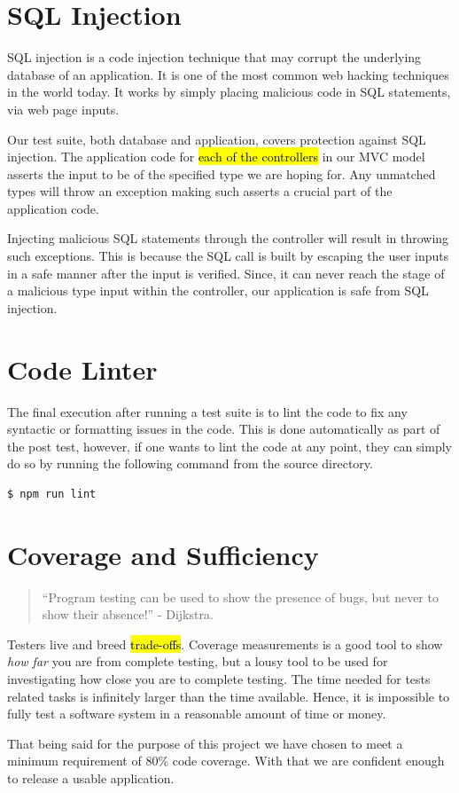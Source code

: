 \documentclass[fontsize=12pt,paper=letter,twoside]{scrartcl}
\begin{document}
\newpage
\section{SQL Injection}
SQL injection is a code injection technique that may corrupt the underlying database of an application. It is one of the most common web hacking techniques in the world today. It works by simply placing malicious code in SQL statements, via web page inputs.

\bigskip
\noindent Our test suite, both database and application, covers protection against SQL injection. The application code for \hl{each of the controllers} in our MVC model asserts the input to be of the specified type we are hoping for. Any unmatched types will throw an exception making such asserts a crucial part of the application code.

\bigskip
\noindent Injecting malicious SQL statements through the controller will result in throwing such exceptions. This is because the SQL call is built by escaping the user inputs in a safe manner after the input is verified. Since, it can never reach the stage of a malicious type input within the controller, our application is safe from SQL injection.

\section{Code Linter}
The final execution after running a test suite is to lint the code to fix any syntactic or formatting issues in the code. This is done automatically as part of the post test, however, if one wants to lint the code at any point, they can simply do so by running the following command from the source directory.


\begin{lstlisting}[language=bash]
	$ npm run lint
\end{lstlisting}

\section{Coverage and Sufficiency}
\begin{quote}
``Program testing can be used to show the presence of bugs, but never to show their absence!'' - Dijkstra.
\end{quote}

\noindent Testers live and breed \hl{trade-offs}. Coverage measurements is a good tool to show \emph{how far} you are from complete testing, but a lousy tool to be used for investigating how close you are to complete testing. The time needed for tests related tasks is infinitely larger than the time available. Hence, it is impossible to fully test a software system in a reasonable amount of time or money.

\bigskip
\noindent That being said for the purpose of this project we have chosen to meet a minimum requirement of 80\% code coverage. With that we are confident enough to release a usable application.
\end{document}

